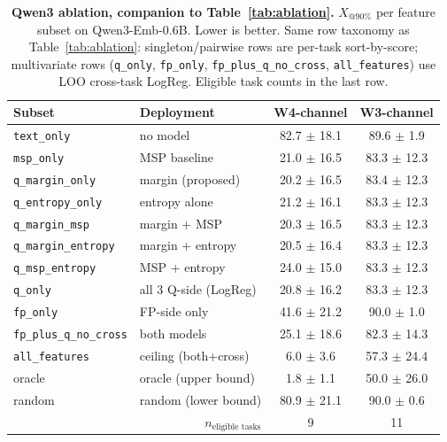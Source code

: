 \documentclass{article}
\makeatletter
\newcommand{\xat}[1]{\ensuremath{X_{@#1\%}}}
\makeatother
\begin{document}


\begin{table}[t]
\centering
\caption{\textbf{Qwen3 ablation, companion to Table~\ref{tab:ablation}.} \xat{90} per feature subset on Qwen3-Emb-0.6B. Lower is better. Same row taxonomy as Table~\ref{tab:ablation}: singleton/pairwise rows are per-task sort-by-score; multivariate rows (\texttt{q\_only}, \texttt{fp\_only}, \texttt{fp\_plus\_q\_no\_cross}, \texttt{all\_features}) use LOO cross-task LogReg. Eligible task counts in the last row.}
\label{tab:qwen3}
\small
\setlength{\tabcolsep}{5pt}
\begin{tabular}{llcc}
\toprule
Subset & Deployment & W4-channel & W3-channel \\
\midrule
\texttt{text\_only}             & no model               & 82.7 $\pm$ 18.1 & 89.6 $\pm$ 1.9 \\
\texttt{msp\_only}              & MSP baseline           & 21.0 $\pm$ 16.5 & 83.3 $\pm$ 12.3 \\
\texttt{q\_margin\_only}        & margin (proposed)      & 20.2 $\pm$ 16.5 & 83.4 $\pm$ 12.3 \\
\texttt{q\_entropy\_only}       & entropy alone          & 21.2 $\pm$ 16.1 & 83.3 $\pm$ 12.3 \\
\texttt{q\_margin\_msp}         & margin + MSP           & 20.3 $\pm$ 16.5 & 83.3 $\pm$ 12.3 \\
\texttt{q\_margin\_entropy}     & margin + entropy       & 20.5 $\pm$ 16.4 & 83.3 $\pm$ 12.3 \\
\texttt{q\_msp\_entropy}        & MSP + entropy          & 24.0 $\pm$ 15.0 & 83.3 $\pm$ 12.3 \\
\texttt{q\_only}                & all 3 Q-side (LogReg)  & 20.8 $\pm$ 16.2 & 83.3 $\pm$ 12.3 \\
\texttt{fp\_only}               & FP-side only           & 41.6 $\pm$ 21.2 & 90.0 $\pm$ 1.0 \\
\texttt{fp\_plus\_q\_no\_cross} & both models            & 25.1 $\pm$ 18.6 & 82.3 $\pm$ 14.3 \\
\texttt{all\_features}          & ceiling (both+cross)   & 6.0 $\pm$ 3.6   & 57.3 $\pm$ 24.4 \\
\midrule
oracle                          & oracle (upper bound)   & 1.8 $\pm$ 1.1   & 50.0 $\pm$ 26.0 \\
random                          & random (lower bound)   & 80.9 $\pm$ 21.1 & 90.0 $\pm$ 0.6 \\
\midrule
\multicolumn{2}{r}{$n_{\text{eligible tasks}}$} & 9 & 11 \\
\bottomrule
\end{tabular}
\end{table}
\end{document}
